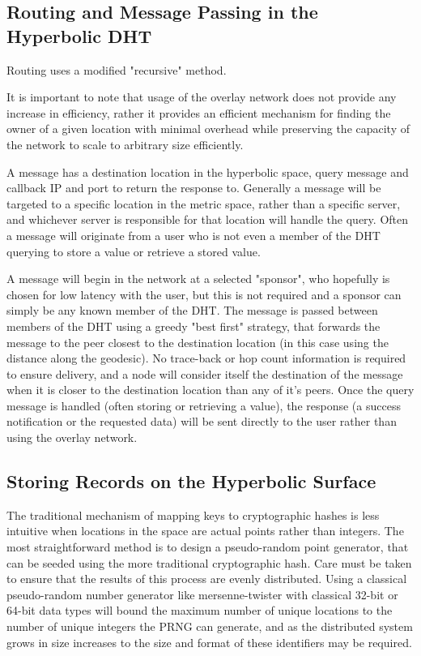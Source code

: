 \subsection{Routing and Message Passing in the Hyperbolic DHT}
Routing uses a modified "recursive" method.

It is important to note that usage of the overlay network does not provide any increase in efficiency, rather it provides an efficient mechanism for finding the owner of a given location with minimal overhead while preserving the capacity of the network to scale to arbitrary size efficiently. 

A message has a destination location in the hyperbolic space, query message and callback IP and port to return the response to.
Generally a message will be targeted to a specific location in the metric space, rather than a specific server, and whichever server is responsible for that location will handle the query.
Often a message will originate from a user who is not even a member of the DHT querying to store a value or retrieve a stored value.

A message will begin in the network at a selected "sponsor", who hopefully is chosen for low latency with the user, but this is not required and a sponsor can simply be any known member of the DHT.
The message is passed between members of the DHT using a greedy "best first" strategy, that forwards the message to the peer closest to the destination location (in this case using the distance along the geodesic).
No trace-back or hop count information is required to ensure delivery, and a node will consider itself the destination of the message when it is closer to the destination location than any of it's peers.
Once the query message is handled (often storing or retrieving a value), the response (a success notification or the requested data) will be sent directly to the user rather than using the overlay network.


\subsection{Storing Records on the Hyperbolic Surface}

The traditional mechanism of mapping keys to cryptographic hashes is less intuitive when locations in the space are actual points rather than integers.
The most straightforward method is to design a pseudo-random point generator, that can be seeded using the more traditional cryptographic hash.
Care must be taken to ensure that the results of this process are evenly distributed.
Using a classical pseudo-random number generator like mersenne-twister with classical 32-bit or 64-bit data types will bound the maximum number of unique locations to the number of unique integers the PRNG can generate, and as the distributed system grows in size increases to the size and format of these identifiers may be required.

